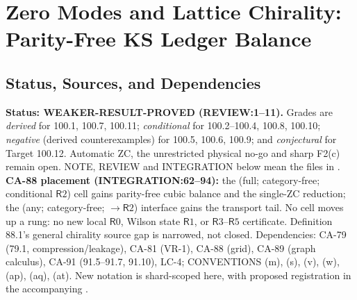 \section{Zero Modes and Lattice Chirality: Parity-Free KS Ledger Balance}
\label{sec:zero-mode-lattice-chirality}

\subsection{Status, Sources, and Dependencies}

\textbf{Status: WEAKER-RESULT-PROVED (REVIEW:1--11).} Grades are \emph{derived} for 100.1, 100.7, 100.11; \emph{conditional} for 100.2--100.4, 100.8, 100.10; \emph{negative} (derived counterexamples) for 100.5, 100.6, 100.9;
and \emph{conjectural} for Target 100.12. Automatic ZC, the unrestricted physical no-go and sharp F2(c) remain open.
NOTE, REVIEW and INTEGRATION below mean the files in .
\textbf{CA-88 placement (INTEGRATION:62--94):} the (full; category-free; conditional \(\mathsf R2\)) cell gains
parity-free cubic balance and the single-ZC reduction; the (any; category-free; \(\to\mathsf R2\)) interface gains
the transport tail. No cell moves up a rung: no new local \(\mathsf R0\), Wilson state \(\mathsf R1\), or \(\mathsf R3\)--\(\mathsf R5\) certificate. Definition 88.1's general chirality source gap is narrowed, not closed.
Dependencies: CA-79 (79.1, compression/leakage), CA-81 (VR-1), CA-88 (grid), CA-89 (graph calculus),
CA-91 (91.5--91.7, 91.10), LC-4; CONVENTIONS (m), (s), (v), (w), (ap), (aq), (at).
New notation is shard-scoped here, with proposed registration in the accompanying .

